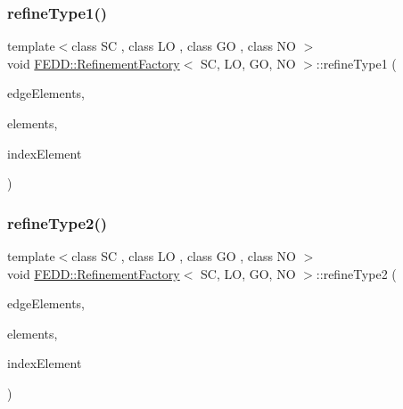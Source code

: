 \mbox{\label{classFEDD_1_1RefinementFactory_a89b2f7d45585b804e32b278b83954153}} 
\subsubsection{\texorpdfstring{refine\+Type1()}{refineType1()}}
{\footnotesize\ttfamily template$<$class SC , class LO , class GO , class NO $>$ \\
void \hyperlink{classFEDD_1_1RefinementFactory}{F\+E\+D\+D\+::\+Refinement\+Factory}$<$ SC, LO, GO, NO $>$\+::refine\+Type1 (\begin{DoxyParamCaption}\item[{\hyperlink{classFEDD_1_1RefinementFactory_ae5285e990ec4632d6188a1280627ad13}{Edge\+Elements\+Ptr\+\_\+\+Type}}]{edge\+Elements,  }\item[{\hyperlink{classFEDD_1_1RefinementFactory_a0994b5b7b6d080048673941251999f2e}{Elements\+Ptr\+\_\+\+Type}}]{elements,  }\item[{int}]{index\+Element }\end{DoxyParamCaption})}

\mbox{\label{classFEDD_1_1RefinementFactory_ac43c76ce4137963ac5aac1355d38dbac}} 
\subsubsection{\texorpdfstring{refine\+Type2()}{refineType2()}}
{\footnotesize\ttfamily template$<$class SC , class LO , class GO , class NO $>$ \\
void \hyperlink{classFEDD_1_1RefinementFactory}{F\+E\+D\+D\+::\+Refinement\+Factory}$<$ SC, LO, GO, NO $>$\+::refine\+Type2 (\begin{DoxyParamCaption}\item[{\hyperlink{classFEDD_1_1RefinementFactory_ae5285e990ec4632d6188a1280627ad13}{Edge\+Elements\+Ptr\+\_\+\+Type}}]{edge\+Elements,  }\item[{\hyperlink{classFEDD_1_1RefinementFactory_a0994b5b7b6d080048673941251999f2e}{Elements\+Ptr\+\_\+\+Type}}]{elements,  }\item[{int}]{index\+Element }\end{DoxyParamCaption})}

